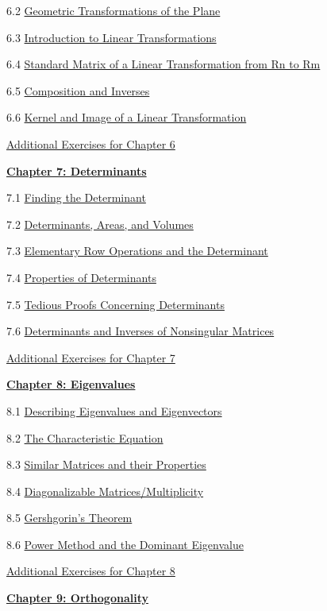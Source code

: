 \documentclass{ximera}
\begin{document}
6.2	\href{\xmbaseurl/LTR-0070/main}{Geometric Transformations of the Plane}
	
6.3	\href{\xmbaseurl/LTR-0010/main}{Introduction to Linear Transformations}
	
6.4	\href{\xmbaseurl/LTR-0020/main}{Standard Matrix of a Linear Transformation from Rn to Rm}
	
6.5	\href{\xmbaseurl/LTR-0030/main}{Composition and Inverses}
	
6.6	\href{\xmbaseurl/LTR-0050/main}{Kernel and Image of a Linear Transformation}
	
\href{\xmbaseurl/SUPX-0060/main}{Additional Exercises for Chapter 6}
	
\href{\xmbaseurl/XLAChapter_det/main}{\textbf{Chapter 7: Determinants}}
	
7.1	\href{\xmbaseurl/DET-0010/main}{Finding the Determinant}
	
7.2	\href{\xmbaseurl/DET-0070/main}{Determinants, Areas, and Volumes}
	
7.3	\href{\xmbaseurl/DET-0030/main}{Elementary Row Operations and the Determinant}
	
7.4	\href{\xmbaseurl/DET-0040/main}{Properties of Determinants}
	
7.5	\href{\xmbaseurl/DET-0050/main}{Tedious Proofs Concerning Determinants}
	
7.6	\href{\xmbaseurl/DET-0060/main}{Determinants and Inverses of Nonsingular Matrices}
	
\href{\xmbaseurl/SUPX-0070/main}{Additional Exercises for Chapter 7}
	
\href{\xmbaseurl/XLAChapter_eigenvalues/main}{\textbf{Chapter 8: Eigenvalues}}
	
8.1	\href{\xmbaseurl/EIG-0010/main}{Describing Eigenvalues and Eigenvectors}
	
8.2	\href{\xmbaseurl/EIG-0020/main}{The Characteristic Equation}
	
8.3	\href{\xmbaseurl/EIG-0040/main}{Similar Matrices and their Properties}
	
8.4	\href{\xmbaseurl/EIG-0050/main}{Diagonalizable Matrices/Multiplicity}
	
8.5	\href{\xmbaseurl/EIG-0080/main}{Gershgorin's Theorem}
	
8.6	\href{\xmbaseurl/EIG-0070/main}{Power Method and the Dominant Eigenvalue}
	
\href{\xmbaseurl/SUPX-0080/main}{Additional Exercises for Chapter 8}
	
\href{\xmbaseurl/XLAChapter_orthogonality/main}{\textbf{Chapter 9: Orthogonality}}
	
\end{document}
